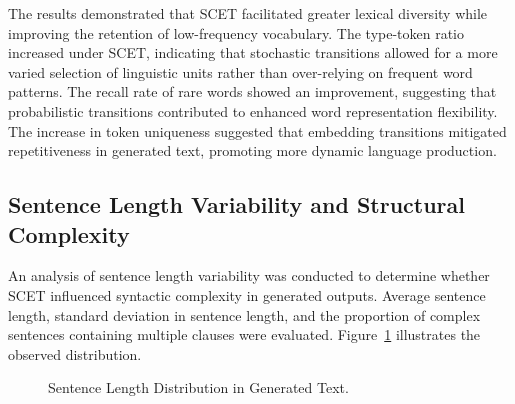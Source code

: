 \documentclass{article}
\begin{document}
\begin{table}[h]
	\caption{Lexical Diversity and Rare Word Retention}
	\label{tab:lexical_diversity}
	\centering
	\renewcommand{\arraystretch}{1.3}
\end{table}

The results demonstrated that SCET facilitated greater lexical diversity while improving the retention of low-frequency vocabulary. The type-token ratio increased under SCET, indicating that stochastic transitions allowed for a more varied selection of linguistic units rather than over-relying on frequent word patterns. The recall rate of rare words showed an improvement, suggesting that probabilistic transitions contributed to enhanced word representation flexibility. The increase in token uniqueness suggested that embedding transitions mitigated repetitiveness in generated text, promoting more dynamic language production.

\subsection{Sentence Length Variability and Structural Complexity}

An analysis of sentence length variability was conducted to determine whether SCET influenced syntactic complexity in generated outputs. Average sentence length, standard deviation in sentence length, and the proportion of complex sentences containing multiple clauses were evaluated. Figure~\ref{fig:sentence_variability} illustrates the observed distribution.

\begin{figure}[h]
	\centering
	\caption{Sentence Length Distribution in Generated Text.}
	\label{fig:sentence_variability}
\end{figure}
\end{document}
